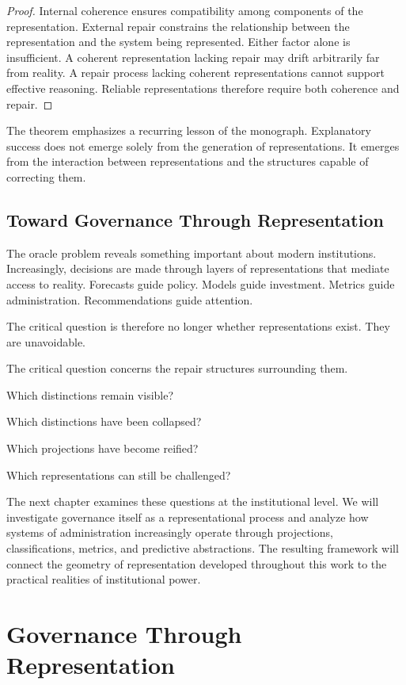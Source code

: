 \documentclass[11pt,oneside,openany]{book}
\begin{document}
\begin{proof}

Internal coherence ensures compatibility among components of the representation. External repair constrains the relationship between the representation and the system being represented. Either factor alone is insufficient. A coherent representation lacking repair may drift arbitrarily far from reality. A repair process lacking coherent representations cannot support effective reasoning. Reliable representations therefore require both coherence and repair.

\end{proof}

The theorem emphasizes a recurring lesson of the monograph. Explanatory success does not emerge solely from the generation of representations. It emerges from the interaction between representations and the structures capable of correcting them.

\section{Toward Governance Through Representation}

The oracle problem reveals something important about modern institutions. Increasingly, decisions are made through layers of representations that mediate access to reality. Forecasts guide policy. Models guide investment. Metrics guide administration. Recommendations guide attention.

The critical question is therefore no longer whether representations exist. They are unavoidable.

The critical question concerns the repair structures surrounding them.

Which distinctions remain visible?

Which distinctions have been collapsed?

Which projections have become reified?

Which representations can still be challenged?

The next chapter examines these questions at the institutional level. We will investigate governance itself as a representational process and analyze how systems of administration increasingly operate through projections, classifications, metrics, and predictive abstractions. The resulting framework will connect the geometry of representation developed throughout this work to the practical realities of institutional power.

\chapter{Governance Through Representation}
\end{document}
